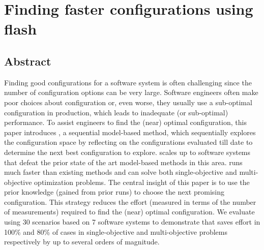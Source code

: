 \chapter{Finding faster configurations using flash}
\label{chapter:flash}


\section{Abstract}
Finding good configurations for a software system is often challenging since the number of configuration options can be very large.
Software engineers often make poor choices about configuration or, even worse, they usually use a sub-optimal configuration in production, which leads to inadequate (or sub-optimal) performance. To assist engineers to find the (near) optimal configuration, this paper introduces   \flash, a sequential model-based method, which sequentially explores the configuration space by reflecting on the configurations evaluated till date to determine the next best configuration to explore.
\flash scales up to software systems that defeat the prior state of the art model-based methods in this area. \flash runs much faster than existing methods and can solve both single-objective and multi-objective optimization problems. The central insight of this paper is to use the prior knowledge (gained from prior runs) to choose the next promising configuration. This strategy reduces the effort (measured in terms of the number of measurements) required to find the (near) optimal configuration. 
We evaluate \flash  using 30 scenarios based on 7 software systems to demonstrate that \flash saves effort in 100\% and 80\% of cases in single-objective and multi-objective problems respectively by up to several orders of magnitude. 

